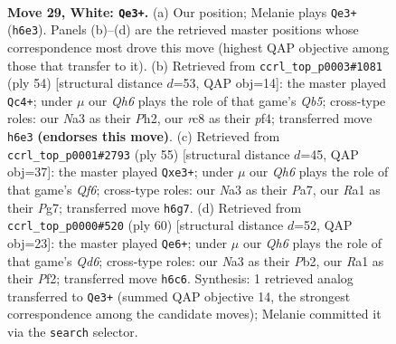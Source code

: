 \documentclass[11pt]{article}
\begin{document}
\clearpage

\begin{figure}[p]\centering
\begin{subfigure}{0.46\textwidth}\centering
\resizebox{\linewidth}{!}{%
\newchessgame
\chessboard[
  setfen={1rr5/7p/1p5Q/p3kb2/7P/N7/PP3PP1/R5K1 w - - 5 29},
  showmover=false,
  pgfstyle=straightmove, color=movearrow, markmove={h6-e3}
]}
\caption{}
\end{subfigure}\hfill
\begin{subfigure}{0.46\textwidth}\centering
\resizebox{\linewidth}{!}{%
\newchessgame
\chessboard[
  setfen={2r1r3/2k4p/3b1p2/PQ6/5p2/2P5/1PK3PP/8 w - - 3 28},
  showmover=false,
  pgfstyle=straightmove, color=movearrow, markmove={b5-c4}
]}
\caption{}
\end{subfigure}
\\[4pt]
\begin{subfigure}{0.46\textwidth}\centering
\resizebox{\linewidth}{!}{%
\newchessgame
\chessboard[
  setfen={6k1/ppB2pp1/7p/8/P7/4PqPP/8/R1R3K1 b - - 0 28},
  showmover=false,
  pgfstyle=straightmove, color=movearrow, markmove={f3-e3}
]}
\caption{}
\end{subfigure}\hfill
\begin{subfigure}{0.46\textwidth}\centering
\resizebox{\linewidth}{!}{%
\newchessgame
\chessboard[
  setfen={2r1k2r/6b1/3Q3p/3p2p1/P7/8/1P3PPP/6K1 w - - 2 31},
  showmover=false,
  pgfstyle=straightmove, color=movearrow, markmove={d6-e6}
]}
\caption{}
\end{subfigure}
\caption{\textbf{Move 29, White: \texttt{Qe3+}.} (a) Our position; Melanie plays \texttt{Qe3+} (\texttt{h6e3}). Panels (b)--(d) are the retrieved master positions whose correspondence most drove this move (highest QAP objective among those that transfer to it). (b) Retrieved from \texttt{ccrl\_top\_p0003\#1081} (ply 54) [structural distance $d$=53, QAP obj=14]: the master played \texttt{Qc4+}; under $\mu$ our \emph{Qh6} plays the role of that game's \emph{Qb5}; cross-type roles: our \emph{N}a3 as their \emph{P}h2, our \emph{r}c8 as their \emph{p}f4; transferred move \texttt{h6e3} \textbf{(endorses this move)}. (c) Retrieved from \texttt{ccrl\_top\_p0001\#2793} (ply 55) [structural distance $d$=45, QAP obj=37]: the master played \texttt{Qxe3+}; under $\mu$ our \emph{Qh6} plays the role of that game's \emph{Qf6}; cross-type roles: our \emph{N}a3 as their \emph{P}a7, our \emph{R}a1 as their \emph{P}g7; transferred move \texttt{h6g7}. (d) Retrieved from \texttt{ccrl\_top\_p0000\#520} (ply 60) [structural distance $d$=52, QAP obj=23]: the master played \texttt{Qe6+}; under $\mu$ our \emph{Qh6} plays the role of that game's \emph{Qd6}; cross-type roles: our \emph{N}a3 as their \emph{P}b2, our \emph{R}a1 as their \emph{P}f2; transferred move \texttt{h6c6}. Synthesis: 1 retrieved analog transferred to \texttt{Qe3+} (summed QAP objective 14, the strongest correspondence among the candidate moves); Melanie committed it via the \texttt{search} selector.}
\label{fig:thought-m56}
\end{figure}
\end{document}
